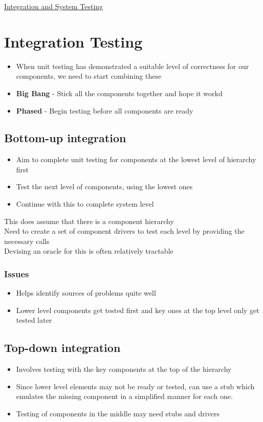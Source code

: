 \documentclass{article}[18pt]
\begin{document}
\begin{center}
\underline{\huge Integration and System Testing}
\end{center}
\section{Integration Testing}
\begin{itemize}
	\item When unit testing has demonstrated a suitable level of correctness for our components, we need to start combining these
	\item \textbf{Big Bang} - Stick all the components together and hope it workd
	\item \textbf{Phased} - Begin testing before all components are ready
\end{itemize}
\subsection{Bottom-up integration}
\begin{itemize}
	\item Aim to complete unit testing for components at the lowest level of hierarchy first
	\item Test the next level of components, using the lowest ones
	\item Continue with this to complete system level
\end{itemize}
This does assume that there is a component hierarchy\\
Need to create a set of component drivers to test each level by providing the necessary calls\\
Devising an oracle for this is often relatively tractable
\subsubsection{Issues}
\begin{itemize}
	\item Helps identify sources of problems quite well
	\item Lower level components get tested first and key ones at the top level only get tested later
\end{itemize}
\subsection{Top-down integration}
\begin{itemize}
	\item Involves testing with the key components at the top of the hierarchy
	\item Since lower level elements may not be ready or tested, can use a stub which emulates the missing component in a simplified manner for each one.
	\item Testing of components in the middle may need stubs and drivers
\end{itemize}
\end{document}
